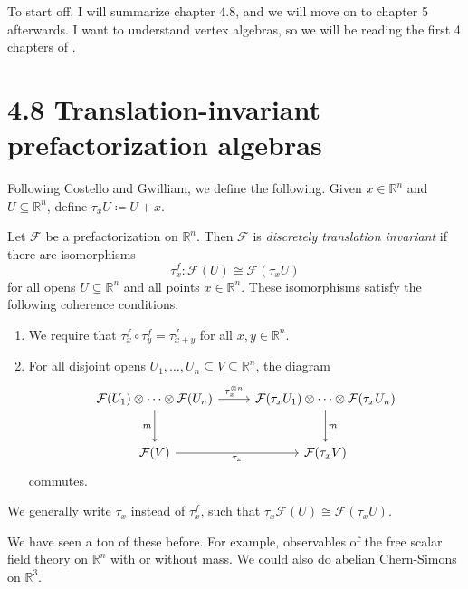 
To start off, I will summarize\cite{costello-gwilliam-1} chapter 4.8, and we will move on to chapter 5 afterwards. I want to understand vertex algebras, so we will be reading the first 4 chapters of \cite{frenkel-ben-zvi}.

\section{\cite{costello-gwilliam-1} 4.8 Translation-invariant prefactorization algebras}

Following Costello and Gwilliam, we define the following. Given $x\in\mathbb{R} ^n$ and $U\subseteq \mathbb{R} ^n$, define $\tau _xU \coloneqq U + x$.

\begin{definition}\label{dfn:discretely-translation-invariant}
	Let $\mathcal{F} $ be a prefactorization on $\mathbb{R} ^n$. Then $\mathcal{F} $ is \emph{discretely translation invariant} if there are isomorphisms
	\[
		\tau_x^f : \mathcal{F} (U)\cong \mathcal{F} (\tau _xU)
	\]
	for all opens $U\subseteq \mathbb{R} ^n$ and all points $x\in\mathbb{R} ^n$. These isomorphisms satisfy the following coherence conditions.
	\begin{enumerate}
		\item We require that $\tau _x^f\circ \tau _y^f = \tau _{x+y}^f$ for all $x,y\in\mathbb{R} ^n$.
		\item For all disjoint opens $U_1, \ldots ,U_n \subseteq V \subseteq \mathbb{R} ^n$, the diagram
		\[
			\begin{tikzcd}[row sep = 2.5em, column sep = 2.5em]
			\mathcal{F} (U_1)\otimes \cdots \otimes \mathcal{F} (U_n) \ar[" \tau_x^{\otimes n}  ", r] \ar[" m "', d]  & \mathcal{F} (\tau _xU_1)\otimes \cdots \otimes \mathcal{F} (\tau _xU_n) \ar[" m ", d]  \\
			\mathcal{F} (V) \ar[" \tau _x "', r]  & \mathcal{F} (\tau _xV)
		\end{tikzcd}
		\] commutes.
	\end{enumerate}
\end{definition}

We generally write $\tau _x$ instead of $\tau _x^f$, such that $\tau _x \mathcal{F} (U)\cong \mathcal{F} (\tau _xU)$.

We have seen a ton of these before. For example, observables of the free scalar field theory on $\mathbb{R} ^n$ with or without mass. We could also do abelian Chern-Simons on $\mathbb{R} ^3$.

